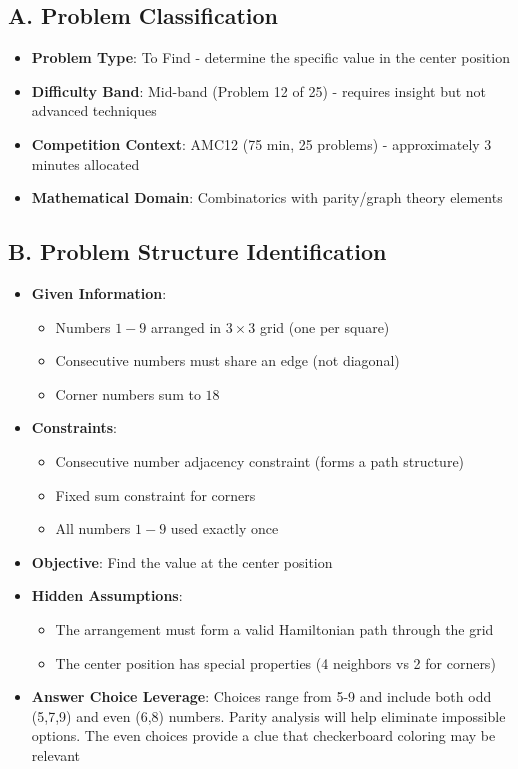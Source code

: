 \documentclass[11pt]{article}
\begin{document}
\begin{problemconfigbox}
\subsection*{A. Problem Classification}
\begin{itemize}[leftmargin=*]
    \item \textbf{Problem Type}: To Find - determine the specific value in the center position
    \item \textbf{Difficulty Band}: Mid-band (Problem 12 of 25) - requires insight but not advanced techniques
    \item \textbf{Competition Context}: AMC12 (75 min, 25 problems) - approximately 3 minutes allocated
    \item \textbf{Mathematical Domain}: Combinatorics with parity/graph theory elements
\end{itemize}

\subsection*{B. Problem Structure Identification}
\begin{itemize}[leftmargin=*]
    \item \textbf{Given Information}: 
    \begin{itemize}
        \item Numbers $1-9$ arranged in $3\times3$ grid (one per square)
        \item Consecutive numbers must share an edge (not diagonal)
        \item Corner numbers sum to $18$
    \end{itemize}
    \item \textbf{Constraints}: 
    \begin{itemize}
        \item Consecutive number adjacency constraint (forms a path structure)
        \item Fixed sum constraint for corners
        \item All numbers $1-9$ used exactly once
    \end{itemize}
    \item \textbf{Objective}: Find the value at the center position
    \item \textbf{Hidden Assumptions}: 
    \begin{itemize}
        \item The arrangement must form a valid Hamiltonian path through the grid
        \item The center position has special properties (4 neighbors vs 2 for corners)
    \end{itemize}
    \item \textbf{Answer Choice Leverage}: Choices range from 5-9 and include both odd (5,7,9) and even (6,8) numbers. Parity analysis will help eliminate impossible options. The even choices provide a clue that checkerboard coloring may be relevant
\end{itemize}


\end{problemconfigbox}
\end{document}
